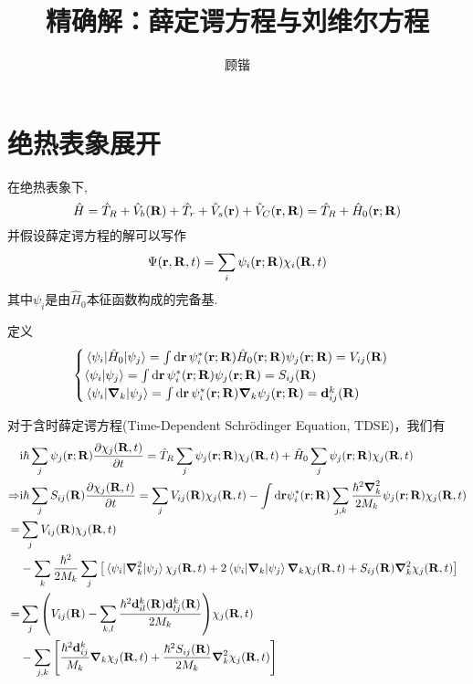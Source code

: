 \documentclass[UTF8,12pt]{article}
\begin{document}
    \title{精确解：薛定谔方程与刘维尔方程}
    \author{顾锴}
    \maketitle

    \section{绝热表象展开}
        在绝热表象下,
        \begin{equation}
            \hat{H}=\hat{T}_R+\hat{V}_b(\vb{R})+\hat{T}_r+\hat{V}_s(\vb{r})+\hat{V}_C(\vb{r},\vb{R})=\hat{T}_R+\hat{H}_0(\vb{r};\vb{R})
        \end{equation}
        并假设薛定谔方程的解可以写作
        \begin{equation}
            \Psi(\vb{r},\vb{R},t)=\sum_i{\psi_i(\vb{r};\vb{R})\chi_i(\vb{R},t)}
        \end{equation}
        其中$\psi_i$是由$\hat{H}_0$本征函数构成的完备基.\par
        定义
        \begin{equation}
            \begin{cases}
                \mel{\psi_i}{\hat{H}_0}{\psi_j}=\int{\dd{\vb{r}}\psi_i^*(\vb{r};\vb{R})\hat{H}_0(\vb{r};\vb{R})\psi_j(\vb{r};\vb{R})}=V_{ij}(\vb{R}) \\
                \ip{\psi_i}{\psi_j}=\int{\dd{\vb{r}}\psi_i^*(\vb{r};\vb{R})\psi_j(\vb{r};\vb{R})}=S_{ij}(\vb{R}) \\
                \mel{\psi_i}{\grad_k}{\psi_j}=\int{\dd{\vb{r}}\psi_i^*(\vb{r};\vb{R})\grad_k\psi_j(\vb{r};\vb{R})}=\vb{d}^k_{ij}(\vb{R})
            \end{cases}
        \end{equation}\par
        对于含时薛定谔方程(Time-Dependent Schr\"odinger Equation, TDSE)，我们有
        \begin{align}
            &\mathrm{i}\hbar\sum_j{\psi_j(\vb{r};\vb{R})\pdv{\chi_j(\vb{R},t)}{t}}=\hat{T}_R\sum_j{\psi_j(\vb{r};\vb{R})\chi_j(\vb{R},t)}+\hat{H}_0\sum_j{\psi_j(\vb{r};\vb{R})\chi_j(\vb{R},t)} \\
            \Rightarrow&\mathrm{i}\hbar\sum_j{S_{ij}(\vb{R})\pdv{\chi_j(\vb{R},t)}{t}}=\sum_j{V_{ij}(\vb{R})\chi_j(\vb{R},t)}-\int{\dd{\vb{r}\psi_i^*(\vb{r};\vb{R})}\sum_{j,k}{\frac{\hbar^2\grad_k^2}{2M_k}\psi_j(\vb{r};\vb{R})\chi_j(\vb{R},t)}} \\
            =&\sum_j{V_{ij}(\vb{R})\chi_j(\vb{R},t)} \nonumber \\
            &-\sum_k{\frac{\hbar^2}{2M_k}\sum_j{\qty[\mel{\psi_i}{\grad^2_k}{\psi_j}\chi_j(\vb{R},t)+2\mel{\psi_i}{\grad_k}{\psi_j}\grad_k\chi_j(\vb{R},t)+S_{ij}(\vb{R})\grad_k^2\chi_j(\vb{R},t)]}} \\
            =&\sum_j{\qty(V_{ij}(\vb{R})-\sum_{k,l}\frac{\hbar^2\vb{d}_{il}^k(\vb{R})\vb{d}_{lj}^k(\vb{R})}{2M_k})\chi_j(\vb{R},t)} \nonumber \\
            &-\sum_{j,k}{\qty[\frac{\hbar^2\vb{d}_{ij}^k}{M_k}\grad_k\chi_j(\vb{R},t)+\frac{\hbar^2S_{ij}(\vb{R})}{2M_k}\grad_k^2\chi_j(\vb{R},t)]}
        \end{align}\par
\end{document}
